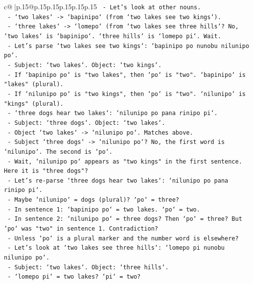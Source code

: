 \documentclass{article}
\begin{document}
{\begin{supertabular}{c@{$\;$}|p{.15\linewidth}@{}p{.15\linewidth}p{.15\linewidth}p{.15\linewidth}p{.15\linewidth}p{.15\linewidth}}
{{{\texttt{     {-} Let's look at other nouns.} \\
\texttt{     {-} `two lakes` {-}> `bapinipo` (from `two lakes see two kings`).} \\
\texttt{     {-} `three lakes` {-}> `lomepo` (from `two lakes see three hills`? No, `two lakes` is `bapinipo`. `three hills` is `lomepo pi`. Wait.} \\
\texttt{     {-} Let's parse `two lakes see two kings`: `bapinipo po nunobu nilunipo po`.} \\
\texttt{       {-} Subject: `two lakes`. Object: `two kings`.} \\
\texttt{       {-} If `bapinipo po` is "two lakes", then `po` is "two". `bapinipo` is "lakes" (plural).} \\
\texttt{       {-} If `nilunipo po` is "two kings", then `po` is "two". `nilunipo` is "kings" (plural).} \\
\texttt{     {-} `three dogs hear two lakes`: `nilunipo po pana rinipo pi`.} \\
\texttt{       {-} Subject: `three dogs`. Object: `two lakes`.} \\
\texttt{       {-} Object `two lakes` {-}> `nilunipo po`. Matches above.} \\
\texttt{       {-} Subject `three dogs` {-}> `nilunipo po`? No, the first word is `nilunipo`. The second is `po`.} \\
\texttt{       {-} Wait, `nilunipo po` appears as "two kings" in the first sentence. Here it is "three dogs"?} \\
\texttt{       {-} Let's re{-}parse `three dogs hear two lakes`: `nilunipo po pana rinipo pi`.} \\
\texttt{         {-} Maybe `nilunipo` = dogs (plural)? `po` = three?} \\
\texttt{         {-} In sentence 1: `bapinipo po` = two lakes. `po` = two.} \\
\texttt{         {-} In sentence 2: `nilunipo po` = three dogs? Then `po` = three? But `po` was "two" in sentence 1. Contradiction?} \\
\texttt{         {-} Unless `po` is a plural marker and the number word is elsewhere?} \\
\texttt{         {-} Let's look at `two lakes see three hills`: `lomepo pi nunobu nilunipo po`.} \\
\texttt{           {-} Subject: `two lakes`. Object: `three hills`.} \\
\texttt{           {-} `lomepo pi` = two lakes? `pi` = two?} \\
}}}
\end{supertabular}}
\end{document}
